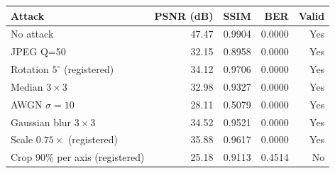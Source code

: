 \begin{tabular}{lrrrr}
\toprule
Attack & PSNR (dB) & SSIM & BER & Valid \\
\midrule
No attack & 47.47 & 0.9904 & 0.0000 & Yes \\
JPEG Q=50 & 32.15 & 0.8958 & 0.0000 & Yes \\
Rotation $5^\circ$ (registered) & 34.12 & 0.9706 & 0.0000 & Yes \\
Median $3\times3$ & 32.98 & 0.9327 & 0.0000 & Yes \\
AWGN $\sigma=10$ & 28.11 & 0.5079 & 0.0000 & Yes \\
Gaussian blur $3\times3$ & 34.52 & 0.9521 & 0.0000 & Yes \\
Scale $0.75\times$ (registered) & 35.88 & 0.9617 & 0.0000 & Yes \\
Crop 90\% per axis (registered) & 25.18 & 0.9113 & 0.4514 & No \\
\bottomrule
\end{tabular}
